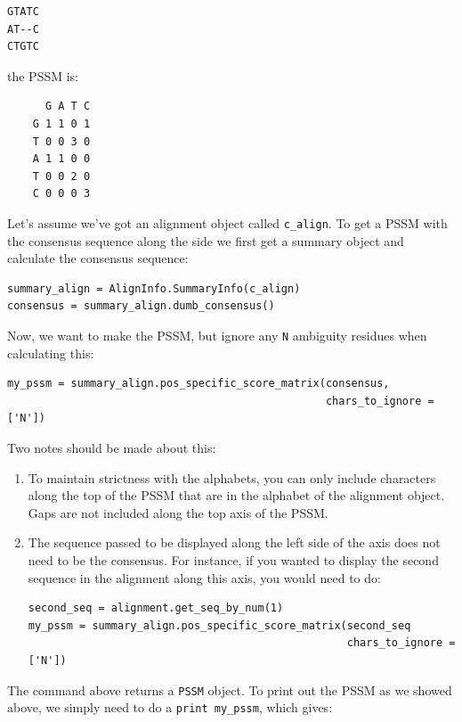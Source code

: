\documentclass{report}
\begin{document}
\begin{verbatim}
GTATC
AT--C
CTGTC
\end{verbatim}

\noindent the PSSM is:

\begin{verbatim}
      G A T C
    G 1 1 0 1
    T 0 0 3 0
    A 1 1 0 0
    T 0 0 2 0
    C 0 0 0 3
\end{verbatim}

Let's assume we've got an alignment object called \verb|c_align|. To get a PSSM with the consensus sequence along the side we first get a summary object and calculate the consensus sequence:

\begin{verbatim}
summary_align = AlignInfo.SummaryInfo(c_align)
consensus = summary_align.dumb_consensus()
\end{verbatim}

Now, we want to make the PSSM, but ignore any \verb|N| ambiguity residues when calculating this:

\begin{verbatim}
my_pssm = summary_align.pos_specific_score_matrix(consensus,
                                                  chars_to_ignore = ['N'])
\end{verbatim}

Two notes should be made about this:

\begin{enumerate}
  \item To maintain strictness with the alphabets, you can only include characters along the top of the PSSM that are in the alphabet of the alignment object. Gaps are not included along the top axis of the PSSM.

  \item The sequence passed to be displayed along the left side of the axis does not need to be the consensus. For instance, if you wanted to display the second sequence in  the alignment along this axis, you would need to do:

\begin{verbatim}
second_seq = alignment.get_seq_by_num(1)
my_pssm = summary_align.pos_specific_score_matrix(second_seq
                                                  chars_to_ignore = ['N'])
\end{verbatim}

\end{enumerate}

The command above returns a \verb|PSSM| object. To print out the PSSM as we showed above, we simply need to do a \verb|print my_pssm|, which gives:
\end{document}
